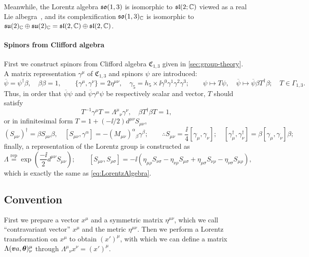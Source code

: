 \documentclass[CheatSheet]{subfiles}
\newcommand{\LorTr}[2]{\Lambda^{#1}{}_{#2}}
\begin{document}
Meanwhile, the Lorentz algebra $\operatorname{\mathfrak{so}}(1,3)$ is isomorphic to $\operatorname{\mathfrak{sl}}(2;\mathbb C)$ viewed as a real Lie albegra~\cite[\S7.8]{Hall2015},
and its complexification
$\operatorname{\mathfrak{so}}(1,3)_{\mathbb C}$ is isomorphic to $
\operatorname{\mathfrak{su}}(2)_{\mathbb C}\oplus\operatorname{\mathfrak{su}}(2)_{\mathbb C}
=\operatorname{\mathfrak{sl}}(2,\mathbb C)\oplus\operatorname{\mathfrak{sl}}(2,\mathbb C)$.

\paragraph{Spinors from Clifford algebra}
First we construct spinors from Clifford algebra $\mathfrak C_{1,3}$ given in \cref{sec:group-theory}. A matrix representation $\gamma^\mu$ of $\mathfrak C_{1,3}$ and spinors $\psi$ are introduced:
\begin{equation}
 \overline\psi = \psi^\dagger\beta, \quad\beta\beta=1,\qquad
\{\gamma^\mu,\gamma^\nu\}=2\eta^{\mu\nu}, \quad
\gamma_5 = h_5\times\ii\gamma^0\gamma^1\gamma^2\gamma^3; \qquad
\psi\mapsto T\psi,\quad
\overline\psi\mapsto \overline\psi\beta T^\dagger \beta;\quad T\in \Gamma_{1,3}.
\end{equation}
Thus, in order that $\overline\psi\psi$ and $\overline\psi\gamma^\mu\psi$ be respectively scalar and vector, $T$ should satisfy
\begin{equation}
 T^{-1}\gamma^\mu T = \LorTr\mu\nu\gamma^\nu,\quad
 \beta T^\dagger \beta T=1,
\end{equation}
or in infinitesimal form $T=1+(-\ii/2)d^{\mu\nu}S_{\mu\nu}$,
\begin{equation}
 (S_{\mu\nu})^\dagger = \beta S_{\mu\nu} \beta,\quad
[S_{\mu\nu},\gamma^\alpha] = -(M_{\mu\nu})^{\alpha}{}_\beta\gamma^\beta;
\qquad
\therefore S_{\mu\nu}=\frac{\ii}{4}[\gamma_\mu,\gamma_\nu];
\quad
[\gamma_\mu^\dagger, \gamma_\nu^\dagger]=\beta[\gamma_\mu,\gamma_\nu]\beta;
\end{equation}
finally, a representation of the Lorentz group is constructed as
\begin{equation}
\Lambda\stackrel{\text{rep}}=
 \exp\left(\frac{-\ii}{2}d^{\mu\nu}S_{\mu\nu}\right);\qquad
 [S_{\mu\nu},S_{\rho\sigma}] = -\ii\left(
\eta_{\mu\rho} S_{\nu\sigma}
-\eta_{\nu\rho} S_{\mu\sigma}
+\eta_{\mu\sigma} S_{\nu\rho}
-\eta_{\nu\sigma} S_{\mu\rho}\right),
\end{equation}
which is exactly the same as \cref{eq:LorentzAlgebra}.






\subsection[Convention]{Convention }
First we prepare a vector $x^\mu$ and a symmetric matrix $\eta^{\mu\nu}$, which we call ``contravariant vector'' $x^\mu$ and the metric $\eta^{\mu\nu}$.
Then we perform a Lorentz transformation on $x^\mu$ to obtain $(x')^\mu$, with which we can define a matrix $\Lambda({\boldsymbol{v}}a,{\boldsymbol{\theta}})^{\mu}_{\nu}$ through 
$\Lambda{}^\mu{}_\nu x^{\nu}=(x')^{\mu}$.
\end{document}
